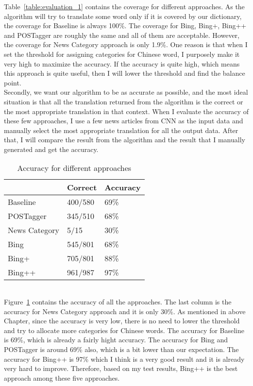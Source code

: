 \documentclass[11pt]{article}
\begin{document}
Table~\ref{table:evaluation_1} contains the coverage for different approaches. As the algorithm will try to translate some word only if it is covered by our dictionary, the coverage for Baseline is always 100\%. The coverage for Bing, Bing+, Bing++ and POSTagger are roughly the same and all of them are acceptable. However, the coverage for News Category approach is only 1.9\%. One reason is that when I set the threshold for assigning categories for Chinese word, I purposely make it very high to maximize the accuracy. If the accuracy is quite high, which means this approach is quite useful, then I will lower the threshold and find the balance point.
\\
Secondly, we want our algorithm to be as accurate as possible, and the most ideal situation is that all the translation returned from the algorithm is the correct or the most appropriate translation in that context. When I evaluate the accuracy of these few approaches, I use a few news articles from CNN as the input data and manually select the most appropriate translation for all the output data. After that, I will compare the result from the algorithm and the result that I manually generated and get the accuracy.
\\
\begin{table}[ht]
  \caption{Accuracy for different approaches}
  \label{table:evaluation_3}
  \begin{tabular}{| p{2cm} | p{2cm} | p{2cm} |}
    \hline
     & Correct & Accuracy\\
    \hline
    Baseline & 400/580 & 69\%\\
    \hline
    POSTagger & 345/510 & 68\%\\
    \hline
    News Category & 5/15 & 30\%\\
    \hline
    Bing & 545/801 & 68\%\\
    \hline
    Bing+ & 705/801 & 88\%\\
    \hline
    Bing++ & 961/987 & 97\%\\
    \hline
  \end{tabular}
\end{table}
\\
Figure~\ref{table:evaluation_3} contains the accuracy of all the approaches. The last column is the accuracy for News Category approach and it is only 30\%. As mentioned in above Chapter, since the accuracy is very low, there is no need to lower the threshold and try to allocate more categories for Chinese words. The accuracy for Baseline is 69\%, which is already a fairly hight accuracy. The accuracy for Bing and POSTagger is around 69\% also, which is a bit lower than our expectation. The accuracy for Bing++ is 97\% which I think is a very good result and it is already very hard to improve. Therefore, based on my test results, Bing++ is the best approach among these five approaches.
\\
\end{document}
